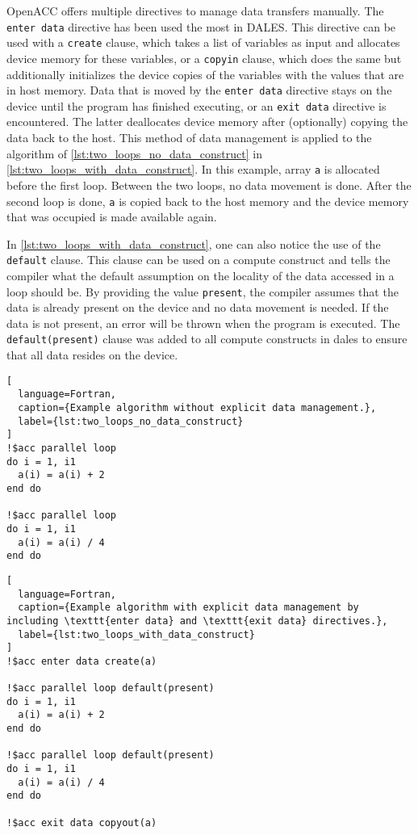 OpenACC offers multiple directives to manage data transfers manually. The \texttt{enter data} directive has been used the most in DALES. This directive can be used with a \texttt{create} clause, which takes a list of variables as input and allocates device memory for these variables, or a \texttt{copyin} clause, which does the same but additionally initializes the device copies of the variables with the values that are in host memory. Data that is moved by the \texttt{enter data} directive stays on the device until the program has finished executing, or an \texttt{exit data} directive is encountered. The latter deallocates device memory after (optionally) copying the data back to the host. This method of data management is applied to the algorithm of \autoref{lst:two_loops_no_data_construct} in \autoref{lst:two_loops_with_data_construct}. In this example, array \texttt{a} is allocated before the first loop. Between the two loops, no data movement is done. After the second loop is done, \texttt{a} is copied back to the host memory and the device memory that was occupied is made available again.

In \autoref{lst:two_loops_with_data_construct}, one can also notice the use of the \texttt{default} clause. This clause can be used on a compute construct and tells the compiler what the default assumption on the locality of the data accessed in a loop should be. By providing the value \texttt{present}, the compiler assumes that the data is already present on the device and no data movement is needed. If the data is not present, an error will be thrown when the program is executed. The \texttt{default(present)} clause was added to all compute constructs in \acrshort{dales} to ensure that all data resides on the device.

\begin{lstlisting}[
  language=Fortran,
  caption={Example algorithm without explicit data management.},
  label={lst:two_loops_no_data_construct}
]
!$acc parallel loop
do i = 1, i1
  a(i) = a(i) + 2
end do

!$acc parallel loop
do i = 1, i1
  a(i) = a(i) / 4
end do
\end{lstlisting}

\begin{lstlisting}[
  language=Fortran,
  caption={Example algorithm with explicit data management by including \texttt{enter data} and \texttt{exit data} directives.},
  label={lst:two_loops_with_data_construct}
]
!$acc enter data create(a)

!$acc parallel loop default(present)
do i = 1, i1
  a(i) = a(i) + 2
end do

!$acc parallel loop default(present)
do i = 1, i1
  a(i) = a(i) / 4
end do

!$acc exit data copyout(a)
\end{lstlisting}



